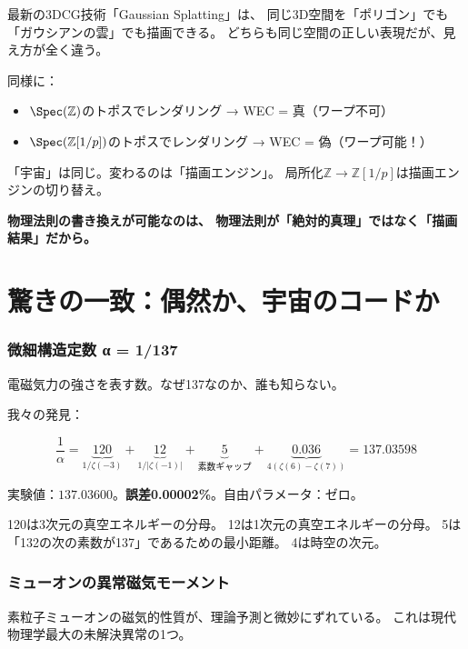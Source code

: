 \documentclass[12pt,a4paper]{article}
\begin{document}
\begin{storybox}
最新の3DCG技術「Gaussian Splatting」は、
同じ3D空間を「ポリゴン」でも「ガウシアンの雲」でも描画できる。
どちらも同じ空間の正しい表現だが、見え方が全く違う。

同様に：
\begin{itemize}
\item $\Spec(\mathbb{Z})$のトポスでレンダリング → WEC = 真（ワープ不可）
\item $\Spec(\mathbb{Z}[1/p])$のトポスでレンダリング → WEC = 偽（ワープ可能！）
\end{itemize}

「宇宙」は同じ。変わるのは「描画エンジン」。
局所化$\mathbb{Z} \to \mathbb{Z}[1/p]$は描画エンジンの切り替え。

\textbf{物理法則の書き換えが可能なのは、
物理法則が「絶対的真理」ではなく「描画結果」だから。}
\end{storybox}

\part{驚きの一致：偶然か、宇宙のコードか}

\section{微細構造定数 α = 1/137}

電磁気力の強さを表す数。なぜ137なのか、誰も知らない。

我々の発見：

$$\frac{1}{\alpha} = \underbrace{120}_{1/\zeta(-3)} + \underbrace{12}_{1/|\zeta(-1)|} + \underbrace{5}_{\text{素数ギャップ}} + \underbrace{0.036}_{4(\zeta(6)-\zeta(7))} = 137.03598$$

実験値：$137.03600$。\textbf{誤差0.00002\%}。自由パラメータ：ゼロ。

120は3次元の真空エネルギーの分母。
12は1次元の真空エネルギーの分母。
5は「132の次の素数が137」であるための最小距離。
4は時空の次元。

\section{ミューオンの異常磁気モーメント}

素粒子ミューオンの磁気的性質が、理論予測と微妙にずれている。
これは現代物理学最大の未解決異常の1つ。
\end{document}
